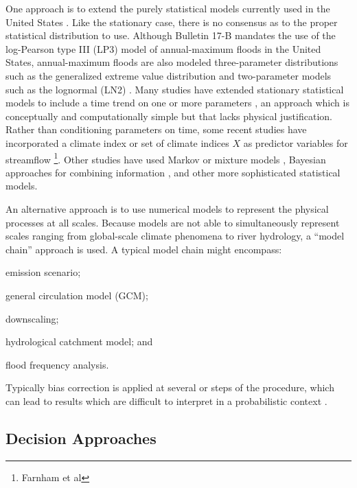 \documentclass[12pt]{article}
\begin{document}
One approach is to extend the purely statistical models currently used in the United States \citep{IACWD1982}.
Like the stationary case, there is no consensus as to the proper statistical distribution to use.
Although Bulletin 17-B \citep{IACWD1982} mandates the use of the log-Pearson type III (LP3) model of annual-maximum floods in the United States, annual-maximum floods are also modeled three-parameter distributions such as the generalized extreme value distribution and two-parameter models such as the lognormal (LN2) \citep{Vogel1996}.
Many studies have extended stationary statistical models to include a time trend on one or more parameters \citep{Obeysekera2014,Vogel2011,Serinaldi2015,Strupczewski2001}, an approach which is conceptually and computationally simple but that lacks physical justification.
Rather than conditioning parameters on time, some recent studies have incorporated a climate index or set of climate indices \(X\) as predictor variables for streamflow \citep{Delgado2014,Silva2016,Sun2014,Griffis2007}\footnote{Farnham et al}.
Other studies have used Markov or mixture models \citep{Waylen1986,Sveinsson2005,Griffis2007}, Bayesian approaches for combining information \citep{Lima2016,Bracken2017}, and other more sophisticated statistical models.

An alternative approach is to use numerical models to represent the physical processes at all scales.
Because models are not able to simultaneously represent scales ranging from global-scale climate phenomena to river hydrology, a ``model chain'' approach is used.
A typical model chain might encompass:
\begin{enumerate*}[label= (\roman*) ]
  \item emission scenario;
  \item general circulation model (GCM);
  \item downscaling;
  \item hydrological catchment model; and
  \item flood frequency analysis.
\end{enumerate*}
Typically bias correction is applied at several or steps of the procedure, which can lead to results which are difficult to interpret in a probabilistic context \citep{Dankers2009,Ott2013,Merz2014,Dittes2017}.

\subsection{Decision Approaches}
\end{document}
